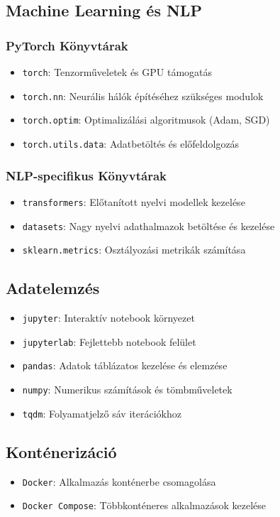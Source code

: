 \documentclass[12pt]{article}
\begin{document}
\subsection{Machine Learning és NLP}

\subsubsection{PyTorch Könyvtárak}
\begin{itemize}
    \item \texttt{torch}: Tenzorműveletek és GPU támogatás
    \item \texttt{torch.nn}: Neurális hálók építéséhez szükséges modulok
    \item \texttt{torch.optim}: Optimalizálási algoritmusok (Adam, SGD)
    \item \texttt{torch.utils.data}: Adatbetöltés és előfeldolgozás
\end{itemize}

\subsubsection{NLP-specifikus Könyvtárak}
\begin{itemize}
    \item \texttt{transformers}: Előtanított nyelvi modellek kezelése
    \item \texttt{datasets}: Nagy nyelvi adathalmazok betöltése és kezelése
    \item \texttt{sklearn.metrics}: Osztályozási metrikák számítása
\end{itemize}

\subsection{Adatelemzés}
\begin{itemize}
    \item \texttt{jupyter}: Interaktív notebook környezet
    \item \texttt{jupyterlab}: Fejlettebb notebook felület
    \item \texttt{pandas}: Adatok táblázatos kezelése és elemzése
    \item \texttt{numpy}: Numerikus számítások és tömbműveletek
    \item \texttt{tqdm}: Folyamatjelző sáv iterációkhoz
\end{itemize}

\subsection{Konténerizáció}
\begin{itemize}
    \item \texttt{Docker}: Alkalmazás konténerbe csomagolása
    \item \texttt{Docker Compose}: Többkonténeres alkalmazások kezelése
\end{itemize}
\end{document}
